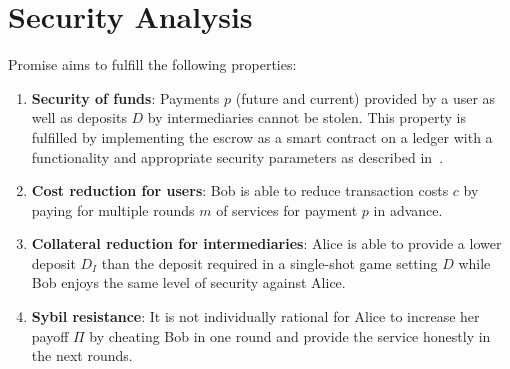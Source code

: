 \documentclass[runningheads]{llncs}
\newcommand{\sys}{Promise\xspace}
\begin{document}

\section{Security Analysis}
\label{sec:security}

\sys aims to fulfill the following properties:

\begin{enumerate}
    \item \textbf{Security of funds}: Payments $p$ (future and current) provided by a user as well as deposits $D$ by intermediaries cannot be stolen. This property is fulfilled by implementing the escrow as a smart contract on a ledger with a functionality and appropriate security parameters as described in~\cite{garay2016bitcoin,gervais2016security}. 
    \item \textbf{Cost reduction for users}: Bob is able to reduce transaction costs $c$ by paying for multiple rounds $m$ of services for payment $p$ in advance.
    \item \textbf{Collateral reduction for intermediaries}: Alice is able to provide a lower deposit $D_I$ than the deposit required in a single-shot game setting $D$ while Bob enjoys the same level of security against Alice.
    \item \textbf{Sybil resistance}: It is not individually rational for Alice to increase her payoff $\Pi$ by cheating Bob in one round and provide the service honestly in the next rounds.
\end{enumerate}

\end{document}
